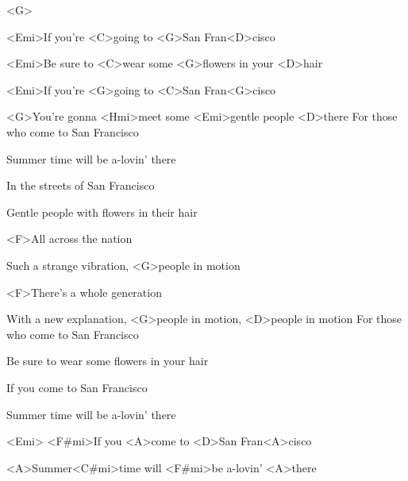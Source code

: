

<G>

\zs
<Emi>If you're <C>going to <G>San Fran<D>cisco

<Emi>Be sure to <C>wear some <G>flowers in your <D>hair

<Emi>If you're <G>going to <C>San Fran<G>cisco

<G>You're gonna <Hmi>meet some <Emi>gentle people <D>there
\ks
\zs
For those who come to San Francisco

Summer time will be a-lovin' there

In the streets of San Francisco

Gentle people with flowers in their hair
\ks

\zr
<F>All across the nation

Such a strange vibration, <G>people in motion

<F>There's a whole generation

With a new explanation, <G>people in motion, <D>people in motion
\kr
\zs
For those who come to San Francisco

Be sure to wear some flowers in your hair

If you come to San Francisco

Summer time will be a-lovin' there
\ks

\zs
<Emi> <F#mi>If you <A>come to <D>San Fran<A>cisco

<A>Summer<C#mi>time will <F#mi>be a-lovin' <A>there
\ks
\kp



